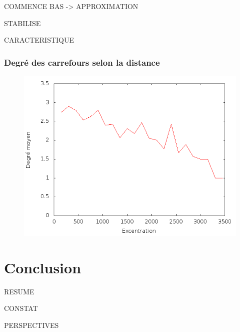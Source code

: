 \documentclass[12pt]{article}
\begin{document}
COMMENCE BAS -> APPROXIMATION

STABILISE

CARACTERISTIQUE

\subsubsection{Degré des carrefours selon la distance}

\begin{figure}[H]
  \centering
  \includegraphics[width=.8\linewidth]{images/degree_distance.png}
  \caption{}
\end{figure}



\section{Conclusion}

RESUME

CONSTAT

PERSPECTIVES

\printbibliography
\end{document}
